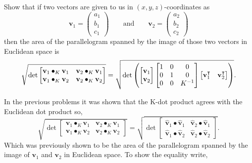 \documentclass[newpage,hints,handout]{ximera}
\begin{document}
\begin{problem}
  
  Show that if two vectors are given to us in $(x,y,z)$-coordinates as
  \[
  \mathbf{v}_{1}=\begin{pmatrix}a_{1} \\ b_{1} \\ c_{1}\end{pmatrix}
  \qquad\text{and}\qquad
  \mathbf{v}_{2} =\begin{pmatrix}a_{2} \\ b_{2} \\ c_{2}\end{pmatrix}
  \]
  then the area of the parallelogram spanned by the image of those two vectors in
  Euclidean space is%
  \[
  \sqrt{\det
    \begin{bmatrix}
      \mathbf{v}_{1}\bullet_{K}\mathbf{v}_{1} & \mathbf{v}_{2}\bullet_{K}\mathbf{v}_{1}\\
      \mathbf{v}_{1}\bullet_{K}\mathbf{v}_{2} & \mathbf{v}_{2}\bullet_{K}\mathbf{v}_{2}%
    \end{bmatrix}}
  =\sqrt{\det\left( 
      \begin{bmatrix}
        \mathbf{v}_{1} \\
        \mathbf{v}_{2}
      \end{bmatrix}
      \begin{bmatrix}
        1 & 0 & 0\\
        0 & 1 & 0\\
        0 & 0 & K^{-1}%
      \end{bmatrix}
      \begin{bmatrix}
        \mathbf{v}_{1}^\transpose & \mathbf{v}_{2}^\transpose%
      \end{bmatrix}
    \right) }.
\]


\begin{freeResponse} In the previous problems it was shown that the K-dot product agrees with the Euclidean dot product so, 
\[
\sqrt{\det
\begin{bmatrix}
\mathbf{v}_{1}\bullet_{K}\mathbf{v}_{1} & \mathbf{v}_{2}\bullet_{K}\mathbf{v}_{1}\\
\mathbf{v}_{1}\bullet_{K}\mathbf{v}_{2} & \mathbf{v}_{2}\bullet_{K}\mathbf{v}_{2}%
\end{bmatrix}}
=
\sqrt{\det
\begin{bmatrix}
\hat{\mathbf v}_{1}\bullet \hat{\mathbf v}_{1} & \hat{\mathbf v}_{2}\bullet \hat{\mathbf v}_{1}\\
\hat{\mathbf v}_{1}\bullet \hat{\mathbf v}_{2} & \hat{\mathbf v}_{2}\bullet \hat{\mathbf v}_{2}%
\end{bmatrix}}.
\]
Which was previously shown to be the area of the parallelogram spanned by the image of $\mathbf{v}_1$ and $\mathbf{v}_2$ in Euclidean space. To show the equality write,


\end{freeResponse}
\end{problem}
\end{document}
